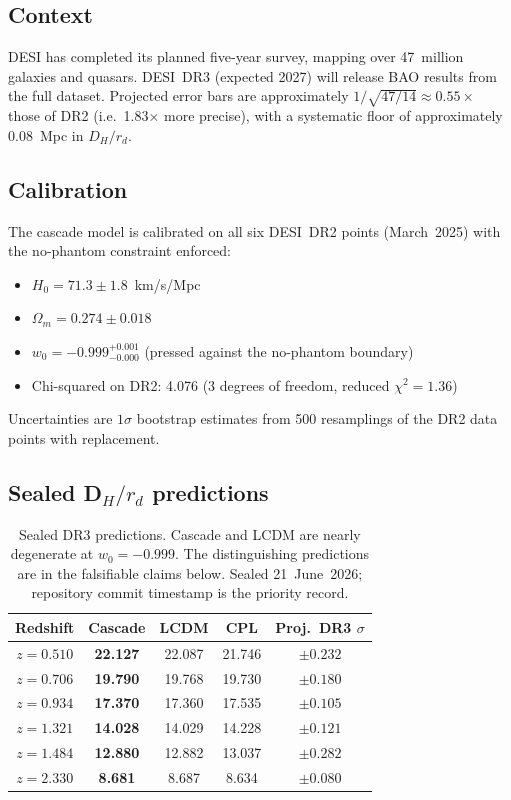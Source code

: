 \documentclass[12pt,a4paper]{article}
\theoremstyle{plain}
\theoremstyle{definition}
\begin{document}
\subsection{Context}

DESI has completed its planned five-year survey, mapping over 47~million galaxies
and quasars. DESI~DR3 (expected 2027) will release BAO results from the full
dataset. Projected error bars are approximately $1/\sqrt{47/14} \approx 0.55\times$
those of DR2 (i.e.\ 1.83$\times$ more precise), with a systematic floor of
approximately 0.08~Mpc in $D_H/r_d$.

\subsection{Calibration}

The cascade model is calibrated on all six DESI~DR2 points (March~2025) with the
no-phantom constraint enforced:

\begin{itemize}
\item $H_0 = 71.3 \pm 1.8$~km/s/Mpc
\item $\Omega_m = 0.274 \pm 0.018$
\item $w_0 = -0.999^{+0.001}_{-0.000}$ (pressed against the no-phantom boundary)
\item Chi-squared on DR2: 4.076 (3 degrees of freedom, reduced $\chi^2 = 1.36$)
\end{itemize}

Uncertainties are $1\sigma$ bootstrap estimates from 500 resamplings of the DR2
data points with replacement.

\subsection{Sealed D$_H/r_d$ predictions}

\begin{table}[h]
\centering
\begin{tabular}{ccccc}
\toprule
Redshift & Cascade & LCDM & CPL & Proj.\ DR3 $\sigma$ \\
\midrule
$z = 0.510$ & \textbf{22.127} & 22.087 & 21.746 & $\pm 0.232$ \\
$z = 0.706$ & \textbf{19.790} & 19.768 & 19.730 & $\pm 0.180$ \\
$z = 0.934$ & \textbf{17.370} & 17.360 & 17.535 & $\pm 0.105$ \\
$z = 1.321$ & \textbf{14.028} & 14.029 & 14.228 & $\pm 0.121$ \\
$z = 1.484$ & \textbf{12.880} & 12.882 & 13.037 & $\pm 0.282$ \\
$z = 2.330$ & \textbf{8.681}  & 8.687  & 8.634  & $\pm 0.080$ \\
\bottomrule
\end{tabular}
\caption{Sealed DR3 predictions. Cascade and LCDM are nearly degenerate at
$w_0 = -0.999$. The distinguishing predictions are in the falsifiable claims below.
Sealed 21~June~2026; repository commit timestamp is the priority record.}
\label{tab:dr3}
\end{table}
\end{document}
